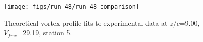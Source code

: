 \begin{figure}[H]
\centering
\texttt{[image: figs/run\_48/run\_48\_comparison]}
\caption{Theoretical vortex profile fits to experimental data at $z/c$=9.00, $V_{free}$=29.19, station 5.}
\label{fig:run_48_comparison}
\end{figure}



